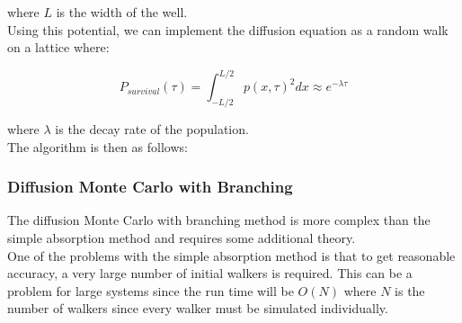 \documentclass[reqno]{amsart}
\numberwithin{equation}{section}
\numberwithin{figure}{section}
\begin{document}
where $L$ is the width of the well. \\

Using this potential, we can implement the diffusion equation as a random walk on a lattice where:

\begin{equation}
    P_{survival}(\tau) = \int_{-L/2}^{L/2} p(x, \tau)^2 dx \approx e^{-\lambda \tau}
\end{equation}

where $\lambda$ is the decay rate of the population. \\

The algorithm is then as follows:



\subsubsection{Diffusion Monte Carlo with Branching}

The diffusion Monte Carlo with branching method is more complex than the simple absorption method and requires some additional theory. \\

One of the problems with the simple absorption method is that to get reasonable accuracy, a very large number of initial walkers is required. This can be a problem for large systems since the run time will be $O(N)$ where $N$ is the number of walkers since every walker must be simulated individually. \\
\end{document}
